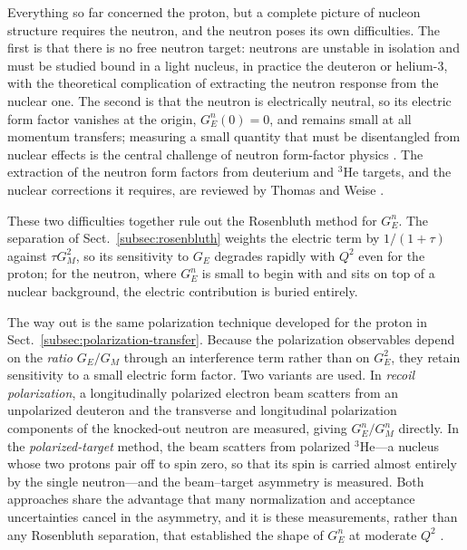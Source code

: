 Everything so far concerned the proton, but a complete picture of nucleon structure
requires the neutron, and the neutron poses its own difficulties. The first is that
there is no free neutron target: neutrons are unstable in isolation and must be studied
bound in a light nucleus, in practice the deuteron or helium-3, with the theoretical
complication of extracting the neutron response from the nuclear one. The second is that
the neutron is electrically neutral, so its electric form factor vanishes at the origin,
$G_{E}^{n}(0)=0$, and remains small at all momentum transfers; measuring a small quantity
that must be disentangled from nuclear effects is the central challenge of neutron
form-factor physics \cite[Ch.~14]{Amsler2018}. The extraction of the neutron form
factors from deuterium and $^{3}\mathrm{He}$ targets, and the nuclear corrections it
requires, are reviewed by Thomas and Weise \cite[Ch.~2.2]{ThomasWeise2001}.

These two difficulties together rule out the Rosenbluth method for $G_{E}^{n}$. The
separation of Sect.~\ref{subsec:rosenbluth} weights the electric term by $1/(1+\tau)$
against $\tau G_{M}^{2}$, so its sensitivity to $G_{E}$ degrades rapidly with $Q^{2}$
even for the proton; for the neutron, where $G_{E}^{n}$ is small to begin with and sits
on top of a nuclear background, the electric contribution is buried entirely.

The way out is the same polarization technique developed for the proton in
Sect.~\ref{subsec:polarization-transfer}. Because the polarization observables depend on
the \emph{ratio} $G_{E}/G_{M}$ through an interference term rather than on
$G_{E}^{2}$, they retain sensitivity to a small electric form factor. Two variants are
used. In \emph{recoil polarization}, a longitudinally polarized electron beam scatters
from an unpolarized deuteron and the transverse and longitudinal polarization components
of the knocked-out neutron are measured, giving $G_{E}^{n}/G_{M}^{n}$ directly. In the
\emph{polarized-target} method, the beam scatters from polarized $^{3}\mathrm{He}$---a
nucleus whose two protons pair off to spin zero, so that its spin is carried almost
entirely by the single neutron---and the beam--target asymmetry is measured. Both
approaches share the advantage that many normalization and acceptance uncertainties
cancel in the asymmetry, and it is these measurements, rather than any Rosenbluth
separation, that established the shape of $G_{E}^{n}$ at moderate $Q^{2}$
\cite[Ch.~2.2]{ThomasWeise2001}.


